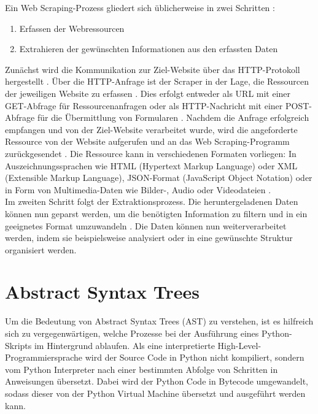 \documentclass[german,bachelor]{swsLeipzig}
\begin{document}
Ein Web Scraping-Prozess gliedert sich üblicherweise in zwei Schritten \cite[S. 1]{zhao2017web}:
\begin{enumerate}
 \item Erfassen der Webressourcen
 \item Extrahieren der gewünschten Informationen aus den erfassten Daten
\end{enumerate}
Zunächst wird die Kommunikation zur Ziel-Website über das HTTP-Protokoll hergestellt \cite[S. 789]{10.1093/bib/bbt026}.
Über die HTTP-Anfrage ist der Scraper in der Lage, die Ressourcen der jeweiligen Website zu erfassen \cite[S. 1]{zhao2017web}.
Dies erfolgt entweder als URL mit einer GET-Abfrage für Ressourcenanfragen oder als HTTP-Nachricht mit einer
POST-Abfrage für die Übermittlung von Formularen \cite[S. 789]{10.1093/bib/bbt026}.
Nachdem die Anfrage erfolgreich empfangen und von der Ziel-Website verarbeitet wurde, wird die angeforderte Ressource
von der Website aufgerufen und an das Web Scraping-Programm zurückgesendet \cite[S. 1]{zhao2017web}.
Die Ressource kann in verschiedenen Formaten vorliegen:
In Auszeichnungssprachen wie HTML (Hypertext Markup Language) oder XML (Extensible Markup Language), JSON-Format
(JavaScript Object Notation) oder in Form von Multimedia-Daten wie Bilder-, Audio oder Videodateien \cite[S. 1]{zhao2017web}.\\

Im zweiten Schritt folgt der Extraktionsprozess.
Die heruntergeladenen Daten können nun geparst werden, um die benötigten Information zu filtern und in ein geeignetes Format
umzuwandeln \cite[S. 790]{10.1093/bib/bbt026}.
Die Daten können nun weiterverarbeitet werden, indem sie beispielsweise analysiert oder in eine gewünschte Struktur
organisiert werden.\\


\section{Abstract Syntax Trees}
Um die Bedeutung von Abstract Syntax Trees (AST) zu verstehen, ist es hilfreich sich zu vergegenwärtigen, welche Prozesse
bei der Ausführung eines Python-Skripts im Hintergrund ablaufen.
Als eine interpretierte High-Level-Programmiersprache wird der Source Code in Python nicht kompiliert, sondern vom
Python Interpreter nach einer bestimmten Abfolge von Schritten in Anweisungen übersetzt.
Dabei wird der Python Code in Bytecode umgewandelt, sodass dieser von der Python Virtual Machine
übersetzt und ausgeführt werden kann. \\
\end{document}
